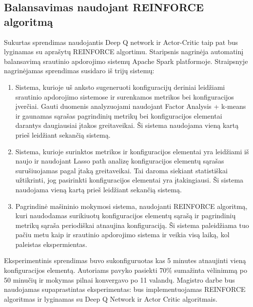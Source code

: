 \documentclass{VUMIFPSbakalaurinis}
\begin{document}
\subsection{Balansavimas naudojant REINFORCE algoritmą}
Sukurtas sprendimas naudojantis Deep Q network ir Actor-Critic taip pat bus lyginamas su \cite{vaquero2018autotuning} aprašytų REINFORCE algortimu. Staripsnis nagrinėja automatinį balansavimą srautinio apdorojimo sistemų Apache Spark platformoje. Straipsnyje nagrinėjamas sprendimas susidaro iš trijų sistemų:
\begin{enumerate}
    \item Sistema, kurioje uš anksto sugeneruoti konfiguracijų deriniai leidžiami srautinio apdorojimo sistemose ir surenkamos metrikos bei konfiguracijos įverčiai. Gauti duomenis analyzuojami naudojant Factor Analysis + k-means ir gaunamas sąrašas pagrindinių metrikų bei konfiguracijos elementai darantys daugiausiai įtakos greitaveikai. Ši sistema naudojama vieną kartą prieš leidžiant sekančią sistemą. 
    \item Sistema, kurioje surinktos metrikos ir konfiguracijos elementai yra leidžiami iš naujo ir naudojant Lasso path analizę konfiguracijos elementų sąrašas surušiuojamas pagal įtaką greitaveikai. Tai daroma siekiant statistiškai užtikrinti, jog pasirinkti konfiguracijos elementai yra įtakingiausi. Ši sistema naudojama vieną kartą prieš leidžiant sekančią sistemą.
    \item Pagrindinė mašininio mokymosi sistema, naudojanti REINFORCE algoritmą, kuri naudodamas surikiuotų konfiguracijos elementų sąrašą ir pagrindinių metrikų sąraša periodiškai atnaujina konfiguraciją. Ši sistema paleidžiama tuo pačiu metu kaip ir srautinio apdorojimo sistema ir veikia visą laiką, kol paleistas ekspermientas.
\end{enumerate}  
Eksperimentinis sprendimas buvo sukonfiguruotas kas 5 minutes atnaujinti vieną konfiguracijos elementą. Autoriams pavyko pasiekti 70\% sumažinta vėlinimmą po 50 minučių ir mokymas pilnai konvergavo po 11 valandų. Magistro darbe bus naudojamas supaprastintas eksperimentas: bus implementuojamas REINFORCE algoritmas ir lyginamas su Deep Q Network ir Actor Critic algoritmais.


\printbibliography[heading=bibintoc] 
\end{document}
